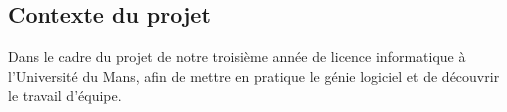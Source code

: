 \subsection{Contexte du projet}
Dans le cadre du projet de notre troisième année de licence informatique à l’Université du Mans, afin de mettre en pratique le génie logiciel et de découvrir le travail d'équipe.
